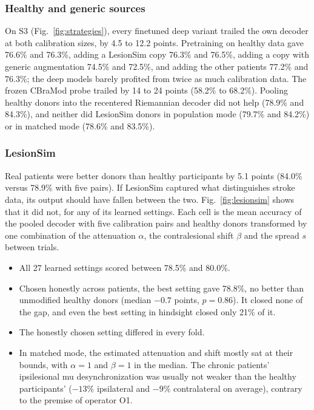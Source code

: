 \documentclass{ieeeaccess}
\begin{document}
\subsubsection{Healthy and generic sources} On S3 (Fig.~\ref{fig:strategies}), every finetuned deep variant trailed the own decoder at both calibration sizes, by 4.5 to 12.2 points. Pretraining on healthy data gave 76.6\% and 76.3\%, adding a LesionSim copy 76.3\% and 76.5\%, adding a copy with generic augmentation 74.5\% and 72.5\%, and adding the other patients 77.2\% and 76.3\%; the deep models barely profited from twice as much calibration data. The frozen CBraMod probe trailed by 14 to 24 points (58.2\% to 68.2\%). Pooling healthy donors into the recentered Riemannian decoder did not help (78.9\% and 84.3\%), and neither did LesionSim donors in population mode (79.7\% and 84.2\%) or in matched mode (78.6\% and 83.5\%).

\subsubsection{LesionSim} Real patients were better donors than healthy participants by 5.1 points (84.0\% versus 78.9\% with five pairs). If LesionSim captured what distinguishes stroke data, its output should have fallen between the two. Fig.~\ref{fig:lesionsim} shows that it did not, for any of its learned settings. Each cell is the mean accuracy of the pooled decoder with five calibration pairs and healthy donors transformed by one combination of the attenuation $\alpha$, the contralesional shift $\beta$ and the spread $s$ between trials.
\begin{itemize}
\item All 27 learned settings scored between 78.5\% and 80.0\%.
\item Chosen honestly across patients, the best setting gave 78.8\%, no better than unmodified healthy donors (median $-0.7$ points, $p = 0.86$). It closed none of the gap, and even the best setting in hindsight closed only 21\% of it.
\item The honestly chosen setting differed in every fold.
\item In matched mode, the estimated attenuation and shift mostly sat at their bounds, with $\alpha = 1$ and $\beta = 1$ in the median. The chronic patients' ipsilesional mu desynchronization was usually not weaker than the healthy participants' ($-13\%$ ipsilateral and $-9\%$ contralateral on average), contrary to the premise of operator O1.
\end{itemize}
\end{document}
